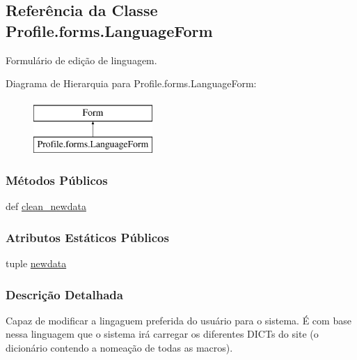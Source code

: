 \hypertarget{classProfile_1_1forms_1_1LanguageForm}{\subsection{Referência da Classe Profile.\-forms.\-Language\-Form}
\label{classProfile_1_1forms_1_1LanguageForm}
}


Formulário de edição de linguagem.  


Diagrama de Hierarquia para Profile.\-forms.\-Language\-Form\-:\begin{figure}[H]
\begin{center}
\leavevmode
\includegraphics[height=2.000000cm]{de/d9b/classProfile_1_1forms_1_1LanguageForm}
\end{center}
\end{figure}
\subsubsection*{Métodos Públicos}
\begin{DoxyCompactItemize}
\item 
def \hyperlink{classProfile_1_1forms_1_1LanguageForm_ab875693b567fc65f8e96af446a4cf78b}{clean\-\_\-newdata}
\end{DoxyCompactItemize}
\subsubsection*{Atributos Estáticos Públicos}
\begin{DoxyCompactItemize}
\item 
tuple \hyperlink{classProfile_1_1forms_1_1LanguageForm_a327d764765fba9b8d9d82c86ca7e08a6}{newdata}
\end{DoxyCompactItemize}


\subsubsection{Descrição Detalhada}
Capaz de modificar a lingaguem preferida do usuário para o sistema. É com base nessa linguagem que o sistema irá carregar os diferentes D\-I\-C\-Ts do site (o dicionário contendo a nomeação de todas as macros). 

